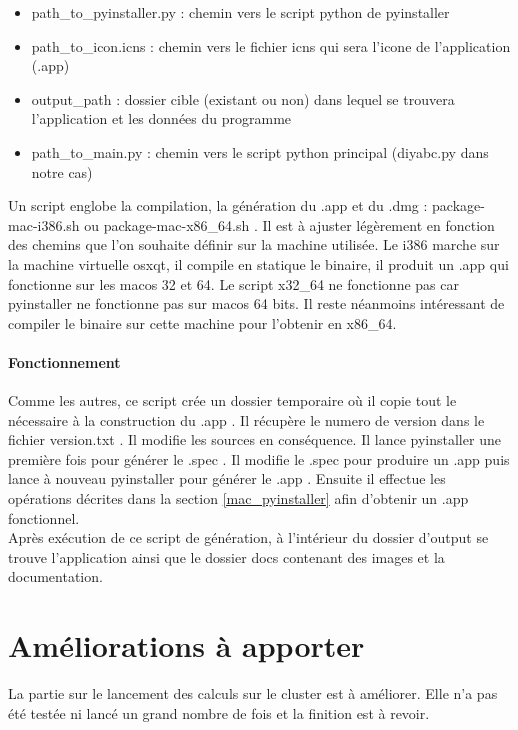 \documentclass[12pt,a4paper]{article}
\begin{document}
        \begin{itemize}
            \item path\_to\_pyinstaller.py : chemin vers le script python de pyinstaller
            \item path\_to\_icon.icns : chemin vers le fichier icns qui sera l'icone de l'application (.app)
            \item output\_path : dossier cible (existant ou non) dans lequel se trouvera l'application et les données du programme
            \item path\_to\_main.py : chemin vers le script python principal (diyabc.py dans notre cas)\\
        \end{itemize}

        Un script englobe la compilation, la génération du .app et du .dmg : package-mac-i386.sh ou
        package-mac-x86\_64.sh . Il est à ajuster légèrement en fonction des chemins que l'on souhaite définir
        sur la machine utilisée. Le i386 marche sur la machine virtuelle osxqt, il compile en statique
        le binaire, il produit un .app qui fonctionne sur les macos 32 et 64. Le script x32\_64 ne fonctionne pas
        car pyinstaller ne fonctionne pas sur macos 64 bits. Il reste néanmoins intéressant de compiler le binaire
        sur cette machine pour l'obtenir en x86\_64.

        \paragraph{Fonctionnement}

        Comme les autres, ce script crée un dossier temporaire où il copie tout
        le nécessaire à la construction du .app .  Il récupère le numero de
        version dans le fichier version.txt . Il modifie les sources en
        conséquence. Il lance pyinstaller une première fois pour générer le
        .spec . Il modifie le .spec pour produire un .app puis lance à nouveau
        pyinstaller pour générer le .app .  Ensuite il effectue les opérations
        décrites dans la section \ref{mac_pyinstaller} afin d'obtenir un .app
        fonctionnel.\\

        Après exécution de ce script de génération, à l'intérieur du dossier
        d'output se trouve l'application ainsi que le dossier docs contenant des
        images et la documentation.

\section{Améliorations à apporter}
    La partie sur le lancement des calculs sur le cluster est à améliorer. Elle
    n'a pas été testée ni lancé un grand nombre de fois et la finition est à
    revoir.\\
    
\end{document}
